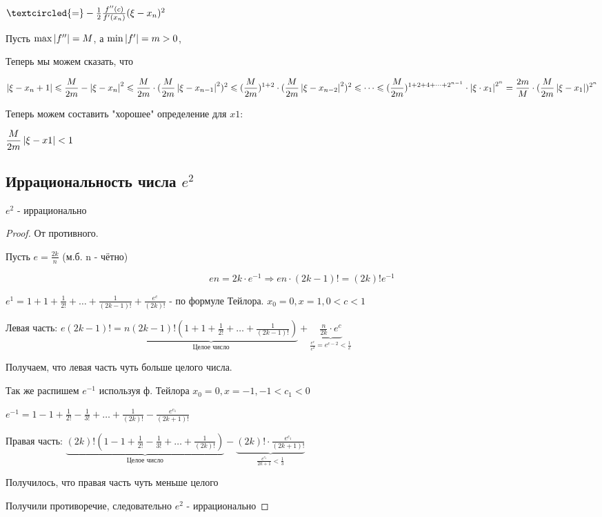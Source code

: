 $\textcircled{=} -\frac{1}{2} \frac{f''(c)}{f'(x_n)}(\xi-x_n)^2$

Пусть $\max\left| f'' \right| = M$, а $\min\left| f' \right| = m > 0$,

Теперь мы можем сказать, что

$\displaystyle
\left| \xi-x_n+1 \right| \leqslant 
\frac{M}{2m}-\left| \xi - x_n \right|^2 \leqslant
\frac{M}{2m}\cdot(\frac{M}{2m}\left| \xi-x_{n-1} \right|^2)^2\leqslant
(\frac{M}{2m})^{1+2}\cdot(\frac{M}{2m}\left| \xi-x_{n-2} \right|^2)^2\leqslant
\dots\leqslant
(\frac{M}{2m})^{1+2+4+\dots+2^{n-1}}\cdot\left| \xi\cdot x_1 \right|^{2^n} =
\frac{2m}{M} \cdot (\frac{M}{2m} \left| \xi - x_1 \right|)^{2^{n}}
$


Теперь можем составить "хорошее" определение для $x1$: 

$\displaystyle \frac{M}{2m}\left| \xi-x1 \right| < 1$
\subsection{Иррациональность числа $e^2$}
\begin{theorem*}
$e^2$ - иррационально
\end{theorem*}
\begin{proof}
От противного.


Пусть $e=\frac{2k}{n}$ (м.б. n - чётно)

$$e n = 2k \cdot e^{-1} \Rightarrow e n \cdot (2k-1)!=(2k)!e^{-1}$$

$e^1=1+1+\frac{1}{2!} + \dots + \frac{1}{(2k-1)!} + \frac{e^c}{(2k)!}$ - по формуле Тейлора. $x_0 = 0, x = 1, 0 < c < 1$

Левая часть:
$\displaystyle e(2k-1)!=\underbrace{n(2k-1)!(1+1+\frac{1}{2!}+\dots+\frac{1}{(2k-1)!})}_\textrm{Целое число} + \underbrace{\frac{n}{2k}\cdot e^c}_{\frac{e^c}{e^2} = e^{c-2} < \frac{1}{e}}$

Получаем, что левая часть чуть больше целого числа.

Так же распишем $e^{-1}$ используя ф. Тейлора $x_0 = 0, x=-1, -1 < c_1 < 0$

$\displaystyle e^{-1} =  1-1+\frac{1}{2!}-\frac{1}{3!}+\dots+\frac{1}{(2k)!}-\frac{e^{c_1}}{(2k+1)!}$

Правая часть:
$\displaystyle \underbrace{(2k)!\left(1-1+\frac{1}{2!}-\frac{1}{3!}+\dots+\frac{1}{(2k)!}\right)}_\textrm{Целое число}-\underbrace{(2k)!\cdot\frac{e^{c_1}}{(2k+1)!}}_{\frac{e^{c_1}}{2k+1}<\frac{1}{3}}$

Получилось, что правая часть чуть меньше целого

Получили противоречие, следовательно $e^2$ - иррационально
\end{proof}
